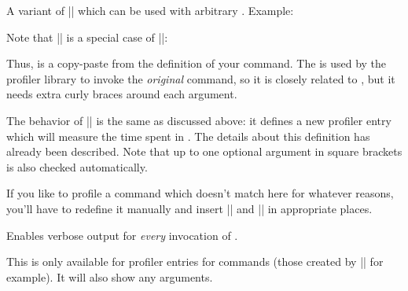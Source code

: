 \begin{command}{\pgfprofilenewforcommandpattern{}}
	A variant of |\pgfprofilenewforcommand| which can be used with arbitrary . Example:

Note that |\pgfprofilenewforcommand| is a special case of |\pgfprofilenewforcommandpattern|:
\begin{codeexample}
\def\mymacro#1#2{ ... }
\pgfprofilenewforcommand{}
\end{codeexample}
	Thus,  is a copy-paste from the definition of your command. The  is used by the profiler library to invoke the \emph{original} command, so it is closely related to , but it needs extra curly braces around each argument.

	The behavior of |\pgfprofilenewforcommandpattern| is the same as discussed above: it defines a new profiler entry which will measure the time spent in . The details about this definition has already been described. Note that up to one optional argument in square brackets is also checked automatically.


	If you like to profile a command which doesn't match here for whatever reasons, you'll have to redefine it manually and insert |\pgfprofilestart| and |\pgfprofileend| in appropriate places.
\end{command}

\begin{command}{\pgfprofileshowinvocationsfor{}}
	Enables verbose output for \emph{every} invocation of .

	This is only available for profiler entries for commands (those created by |\pgfprofilenewforcommand| for example). It will also show any arguments.
\end{command}

